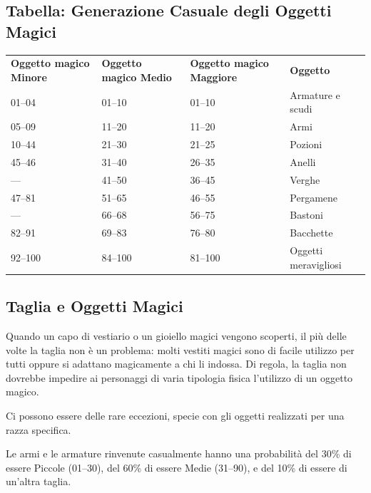 \documentclass[a4paper,11pt,twoside,openany]{book}
\begin{document}
\subsection{Tabella: Generazione Casuale degli Oggetti Magici}

\label{tabella-generazione-casuale-degli-oggetti-magici}

\begin{tabular}{llll}
	\toprule
	\textbf{Oggetto magico Minore} & \textbf{ Oggetto magico Medio} & \textbf{Oggetto magico Maggiore} & \textbf{Oggetto}    \\
	01--04         & 01--10         & 01--10           & Armature e scudi\\
	05--09         & 11--20         & 11--20           & Armi\\
	10--44         & 21--30         & 21--25           & Pozioni\\
	45--46         & 31--40         & 26--35           & Anelli\\
	---            & 41--50         & 36--45           & Verghe\\
	47--81         & 51--65         & 46--55           & Pergamene\\
	---            & 66--68         & 56--75           & Bastoni\\
	82--91         & 69--83         & 76--80           & Bacchette\\
	92--100        & 84--100        & 81--100          & Oggetti meravigliosi\\
\end{tabular}


\subsection{Taglia e Oggetti Magici}

\label{taglia-e-oggetti-magici}

Quando un capo di vestiario o un gioiello magici vengono scoperti, il più delle volte la taglia non è un problema: molti vestiti magici sono di facile utilizzo per tutti oppure si adattano magicamente a chi li indossa. Di regola, la taglia non dovrebbe impedire ai personaggi di varia tipologia fisica l'utilizzo di un oggetto magico.

Ci possono essere delle rare eccezioni, specie con gli oggetti realizzati per una razza specifica.

Le armi e le armature rinvenute casualmente hanno una probabilità del 30\% di essere Piccole (01--30), del 60\% di essere Medie (31--90), e del 10\% di essere di un'altra taglia.
\end{document}

